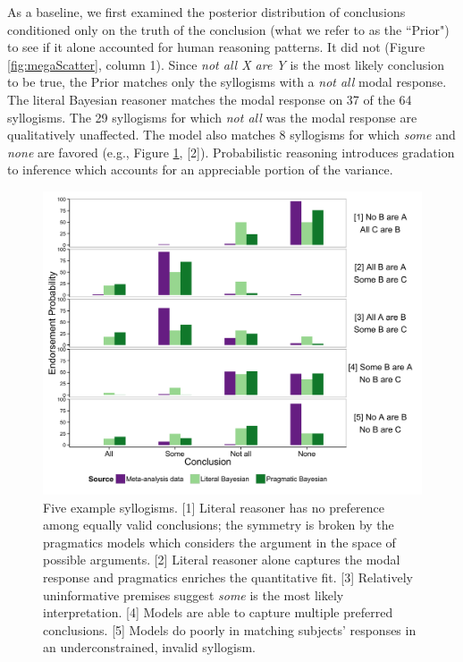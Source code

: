 \documentclass[10pt,letterpaper]{article}
\begin{document}
As a baseline, we first examined the posterior distribution of conclusions conditioned only on the truth of the conclusion (what we refer to as the ``Prior") to see if it alone accounted for human reasoning patterns. It did not (Figure \ref{fig:megaScatter}, column 1). Since \emph{not all X are Y} is the most likely conclusion to be true, the Prior matches only the syllogisms with a \emph{not all} modal response. 
%
The literal Bayesian reasoner matches the modal response on 37 of the 64 syllogisms. The 29 syllogisms for which \emph{not all} was the modal response are qualitatively unaffected. The model also matches 8 syllogisms for which \emph{some} and \emph{none} are favored (e.g., Figure \ref{fig:barplots}, [2]). Probabilistic reasoning introduces gradation to inference which accounts for an appreciable portion of the variance.
%
\begin{figure}
\centering
    \includegraphics[width=\columnwidth]{multibar_fig1}
    \caption{Five example syllogisms. 
    [1] Literal reasoner  has no preference among equally valid conclusions; the symmetry is broken by the pragmatics models which considers the argument in the space of possible arguments.     
    [2] Literal reasoner alone captures the modal response and pragmatics enriches the quantitative fit.     
    [3] Relatively uninformative premises suggest \emph{some} is the most likely interpretation. 
    [4] Models are able to capture multiple preferred conclusions. 
    [5] Models do poorly in matching subjects' responses in an underconstrained, invalid syllogism.}
  \label{fig:barplots}
\end{figure}
\end{document}
